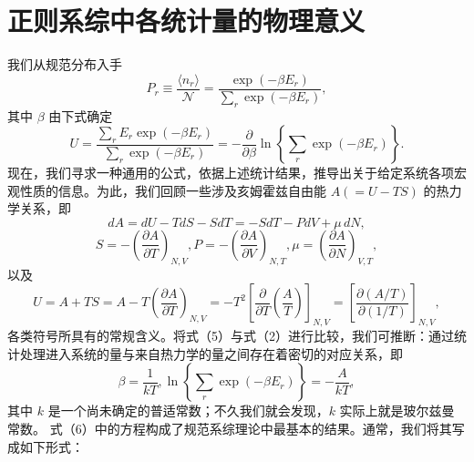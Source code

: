 \section{正则系综中各统计量的物理意义}\label{ux6b63ux5219ux7cfbux7efcux7edfux8ba1ux91cfux7269ux7406ux610fux4e49}
我们从规范分布入手
\begin{equation}\tag{3.3.1}\label{eq:3.3.1}
P _ { r } \equiv \frac { \langle n _ { r } \rangle } { \mathcal { N } } = \frac { \exp ( - \beta E _ { r } ) } { \sum _ { r } \exp ( - \beta E _ { r } ) } ,
\end{equation}
其中 \(\beta\) 由下式确定
\begin{equation}\tag{3.3.2}\label{eq:3.3.2}
U = \frac { \sum _ { r } E _ { r } \exp ( - \beta E _ { r } ) } { \sum _ { r } \exp ( - \beta E _ { r } ) } = - \frac { \partial } { \partial \beta } \ln \left\{ \sum _ { r } \exp ( - \beta E _ { r } ) \right\} .
\end{equation}
现在，我们寻求一种通用的公式，依据上述统计结果，推导出关于给定系统各项宏观性质的信息。为此，我们回顾一些涉及亥姆霍兹自由能 \(A(=U-TS)\) 的热力学关系，即
\begin{equation}\tag{3.3.3}\label{eq:3.3.3}
d A = d U - T d S - S d T = - S d T - P d V + \mu \, d N ,
\end{equation}
\begin{equation}\tag{3.3.4}\label{eq:3.3.4}
S = - \left( \frac { \partial A } { \partial T } \right) _ { N , V } ,  P = - \left( \frac { \partial A } { \partial V } \right) _ { N , T } ,  \mu = \left( \frac { \partial A } { \partial N } \right) _ { V , T } ,
\end{equation}
以及
\begin{equation}\tag{3.3.5}\label{eq:3.3.5}
U = A + T S = A - T \left( \frac { \partial A } { \partial T } \right) _ { N , V } = - T ^{2} \left[ \frac { \partial } { \partial T } \left( \frac { A } { T } \right) \right] _ { N , V } = \left[ \frac { \partial ( A / T ) } { \partial ( 1 / T ) } \right] _ { N , V } ,
\end{equation}
各类符号所具有的常规含义。将式（5）与式（2）进行比较，我们可推断：通过统计处理进入系统的量与来自热力学的量之间存在着密切的对应关系，即
\begin{equation}\tag{3.3.6}\label{eq:3.3.6}
\beta = \frac { 1 } { k T } ,  \ln \left\{ \sum _ { r } \exp ( - \beta E _ { r } ) \right\} = - \frac { A } { k T } ,
\end{equation}
其中 \(k\) 是一个尚未确定的普适常数；不久我们就会发现，\(k\) 实际上就是玻尔兹曼常数。
式（6）中的方程构成了规范系综理论中最基本的结果。通常，我们将其写成如下形式：
